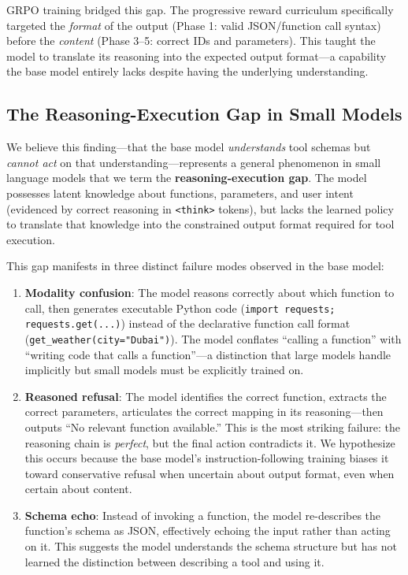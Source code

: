 \documentclass[10pt,twocolumn]{article}
\begin{document}
GRPO training bridged this gap. The progressive reward curriculum specifically targeted the \textit{format} of the output (Phase 1: valid JSON/function call syntax) before the \textit{content} (Phase 3--5: correct IDs and parameters). This taught the model to translate its reasoning into the expected output format---a capability the base model entirely lacks despite having the underlying understanding.

\subsection{The Reasoning-Execution Gap in Small Models}

We believe this finding---that the base model \textit{understands} tool schemas but \textit{cannot act} on that understanding---represents a general phenomenon in small language models that we term the \textbf{reasoning-execution gap}. The model possesses latent knowledge about functions, parameters, and user intent (evidenced by correct reasoning in \texttt{<think>} tokens), but lacks the learned policy to translate that knowledge into the constrained output format required for tool execution.

This gap manifests in three distinct failure modes observed in the base model:

\begin{enumerate}[itemsep=2pt]
    \item \textbf{Modality confusion}: The model reasons correctly about which function to call, then generates executable Python code (\texttt{import requests; requests.get(...)}) instead of the declarative function call format (\texttt{get\_weather(city="Dubai")}). The model conflates ``calling a function'' with ``writing code that calls a function''---a distinction that large models handle implicitly but small models must be explicitly trained on.

    \item \textbf{Reasoned refusal}: The model identifies the correct function, extracts the correct parameters, articulates the correct mapping in its reasoning---then outputs ``No relevant function available.'' This is the most striking failure: the reasoning chain is \textit{perfect}, but the final action contradicts it. We hypothesize this occurs because the base model's instruction-following training biases it toward conservative refusal when uncertain about output format, even when certain about content.

    \item \textbf{Schema echo}: Instead of invoking a function, the model re-describes the function's schema as JSON, effectively echoing the input rather than acting on it. This suggests the model understands the schema structure but has not learned the distinction between describing a tool and using it.
\end{enumerate}
\end{document}
